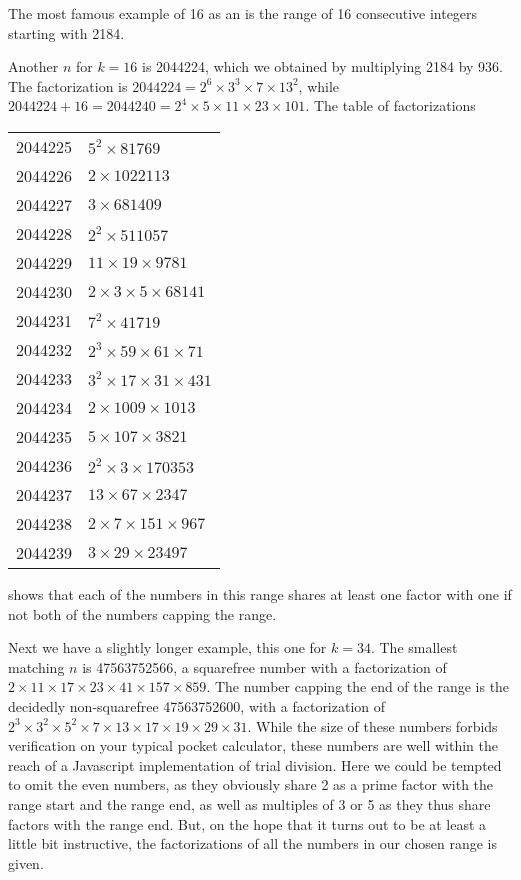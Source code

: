 \documentclass[12pt]{article}
\begin{document}
The most famous example of 16 as an  is the range of 16 consecutive integers starting with 2184.

Another $n$ for $k = 16$ is 2044224, which we obtained by multiplying 2184 by 936. The factorization is $2044224 = 2^6 \times 3^3 \times 7 \times 13^2$, while $2044224 + 16 = 2044240 = 2^4 \times 5 \times 11 \times 23 \times 101$. The table of factorizations

\begin{tabular}{|r|l|}
2044225 & $5^2 \times 81769$ \\
2044226 & $2 \times 1022113$ \\
2044227 & $3 \times 681409$ \\
2044228 & $2^2 \times 511057$ \\
2044229 & $11 \times 19 \times 9781$ \\
2044230 & $2 \times 3 \times 5 \times 68141$ \\
2044231 & $7^2 \times 41719$ \\
2044232 & $2^3 \times 59 \times 61 \times 71$ \\
2044233 & $3^2 \times 17 \times 31 \times 431$ \\
2044234 & $2 \times 1009 \times 1013$ \\
2044235 & $5 \times 107 \times 3821$ \\
2044236 & $2^2 \times 3 \times 170353$ \\
2044237 & $13 \times 67 \times 2347$ \\
2044238 & $2 \times 7 \times 151 \times 967$ \\
2044239 & $3 \times 29 \times 23497$ \\
\end{tabular}

shows that each of the numbers in this range shares at least one factor with one if not both of the numbers capping the range.

Next we have a slightly longer example, this one for $k = 34$. The smallest matching $n$ is 47563752566, a squarefree number with a factorization of $2 \times 11 \times 17 \times 23 \times 41 \times 157 \times 859$. The number capping the end of the range is the decidedly non-squarefree 47563752600, with a factorization of $2^3 \times 3^2 \times 5^2 \times 7 \times 13 \times 17 \times 19 \times 29 \times 31$. While the size of these numbers forbids verification on your typical pocket calculator, these numbers are well within the reach of a Javascript implementation of trial division. Here we could be tempted to omit the even numbers, as they obviously share 2 as a prime factor with the range start and the range end, as well as multiples of 3 or 5 as they thus share factors with the range end. But, on the hope that it turns out to be at least a little bit instructive, the factorizations of all the numbers in our chosen range is given.
\end{document}
